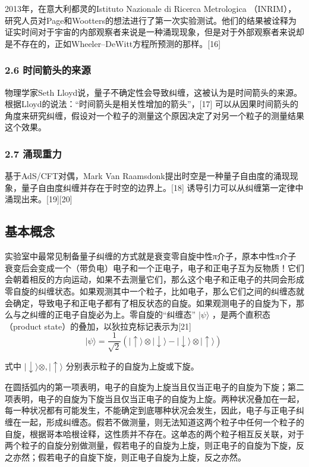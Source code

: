 2013年，在意大利都灵的Istituto Nazionale di Ricerca Metrologica （INRIM），研究人员对Page和Wootters的想法进行了第一次实验测试。他们的结果被诠释为证实时间对于宇宙的内部观察者来说是一种涌现现象，但是对于外部观察者来说却是不存在的，正如Wheeler–DeWitt方程所预测的那样。[16]

\subsubsection{2.6 时间箭头的来源}
物理学家Seth Lloyd说，量子不确定性会导致纠缠，这被认为是时间箭头的来源。根据Lloyd的说法：“时间箭头是相关性增加的箭头”，[17] 可以从因果时间箭头的角度来研究纠缠，假设对一个粒子的测量这个原因决定了对另一个粒子的测量结果这个效果。

\subsubsection{2.7 涌现重力}
基于AdS/CFT对偶，Mark Van Raamsdonk提出时空是一种量子自由度的涌现现象，量子自由度纠缠并存在于时空的边界上。[18] 诱导引力可以从纠缠第一定律中涌现出来。[19][20]

\subsection{基本概念}
实验室中最常见制备量子纠缠的方式就是衰变零自旋中性π介子，原本中性π介子衰变后会变成一个（带负电）电子和一个正电子，电子和正电子互为反物质！它们会朝着相反的方向运动，如果不去测量它们，那么这个电子和正电子的共同会形成零自旋的纠缠状态。如果观测其中一个粒子，比如电子，那么它们之间的纠缠态就会确定，导致电子和正电子都有了相反状态的自旋。如果观测电子的自旋为下，那么与之纠缠的正电子自旋必为上。零自旋的“纠缠态” $|\psi \rangle$ ，是两个直积态（product state）的叠加，以狄拉克标记表示为[21]
$$|\psi \rangle = \frac{1}{\sqrt{2}} \left( |\uparrow \rangle \otimes |\downarrow \rangle - |\downarrow \rangle \otimes |\uparrow \rangle \right)~$$

式中 $|\downarrow \rangle \otimes,|\uparrow \rangle$ 分别表示粒子的自旋为上旋或下旋。

在圆括弧内的第一项表明，电子的自旋为上旋当且仅当正电子的自旋为下旋；第二项表明，电子的自旋为下旋当且仅当正电子的自旋为上旋。两种状况叠加在一起，每一种状况都有可能发生，不能确定到底哪种状况会发生，因此，电子与正电子纠缠在一起，形成纠缠态。假若不做测量，则无法知道这两个粒子中任何一个粒子的自旋，根据哥本哈根诠释，这性质并不存在。这单态的两个粒子相互反关联，对于两个粒子的自旋分别做测量，假若电子的自旋为上旋，则正电子的自旋为下旋，反之亦然；假若电子的自旋下旋，则正电子自旋为上旋，反之亦然。

